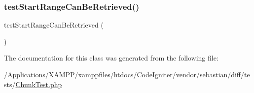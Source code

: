 \subsubsection{\texorpdfstring{test\+Start\+Range\+Can\+Be\+Retrieved()}{testStartRangeCanBeRetrieved()}}
{\footnotesize\ttfamily test\+Start\+Range\+Can\+Be\+Retrieved (\begin{DoxyParamCaption}{ }\end{DoxyParamCaption})}



The documentation for this class was generated from the following file\+:\begin{DoxyCompactItemize}
\item 
/\+Applications/\+X\+A\+M\+P\+P/xamppfiles/htdocs/\+Code\+Igniter/vendor/sebastian/diff/tests/\mbox{\hyperlink{_chunk_test_8php}{Chunk\+Test.\+php}}\end{DoxyCompactItemize}
